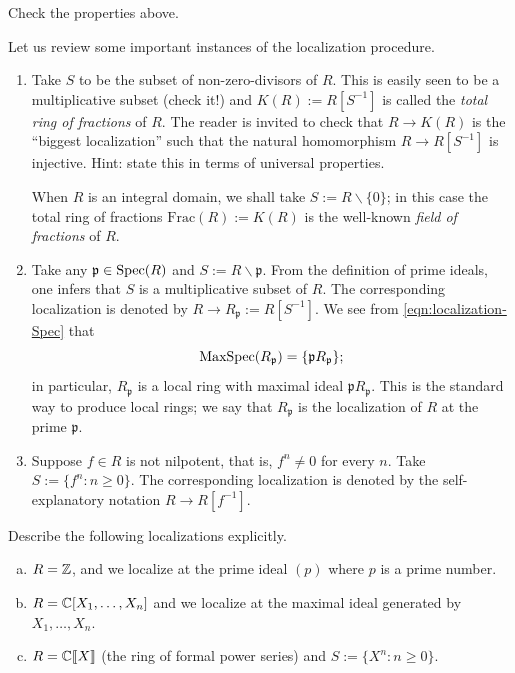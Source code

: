 \begin{exercise}
	Check the properties above.
\end{exercise}

Let us review some important instances of the localization procedure.
\begin{enumerate}
	\item Take $S$ to be the subset of non-zero-divisors of $R$. This is easily seen to be a multiplicative subset (check it!) and $K(R) := R[S^{-1}]$ is called the \emph{total ring of fractions} of $R$. The reader is invited to check that $R \to K(R)$ is the ``biggest localization'' such that the natural homomorphism $R \to R[S^{-1}]$ is injective. Hint: state this in terms of universal properties.
	
	When $R$ is an integral domain, we shall take $S := R \smallsetminus \{0\}$; in this case the total ring of fractions $\text{Frac}(R) := K(R)$ is the well-known \emph{field of fractions} of $R$.
	
	\item Take any $\mathfrak{p} \in \operatorname{Spec}(R)$ and $S := R \smallsetminus \mathfrak{p}$. From the definition of prime ideals, one infers that $S$ is a multiplicative subset of $R$. The corresponding localization is denoted by $R \to R_{\mathfrak{p}} := R[S^{-1}]$. We see from \eqref{eqn:localization-Spec} that
		\[ \operatorname{MaxSpec}(R_{\mathfrak{p}}) = \{ \mathfrak{p} R_{\mathfrak{p}} \}; \]
	in particular, $R_{\mathfrak{p}}$ is a local ring with maximal ideal $\mathfrak{p}R_{\mathfrak{p}}$. This is the standard way to produce local rings; we say that $R_{\mathfrak{p}}$ is the localization of $R$ at the prime $\mathfrak{p}$.

	\item Suppose $f \in R$ is not nilpotent, that is, $f^n \neq 0$ for every $n$. Take $S := \{ f^n : n \geq 0 \}$. The corresponding localization is denoted by the self-explanatory notation $R \to R[f^{-1}]$.
\end{enumerate}

\begin{exercise}
	Describe the following localizations explicitly.
	\begin{enumerate}[(a)]
		\item $R = \mathbb{Z}$, and we localize at the prime ideal $(p)$ where $p$ is a prime number.
		\item $R = \mathbb{C}[X_1, \ldots, X_n]$ and we localize at the maximal ideal generated by $X_1, \ldots, X_n$.
		\item $R = \mathbb{C}\llbracket X \rrbracket$ (the ring of formal power series) and $S := \{X^n : n \geq 0 \}$.
	\end{enumerate}
\end{exercise}

